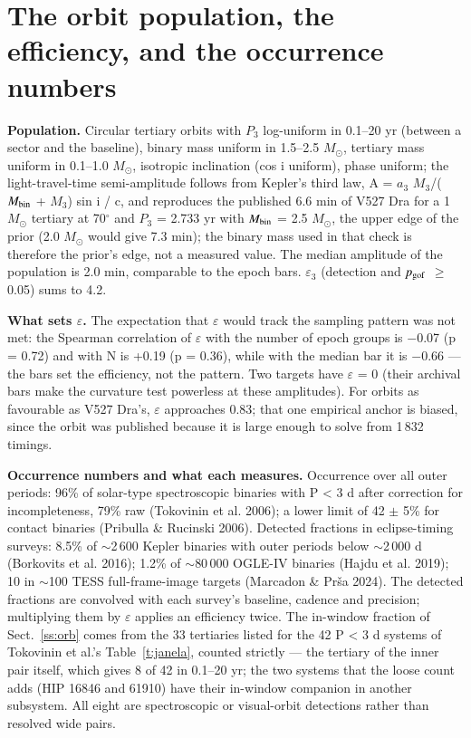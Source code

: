 \documentclass{aa}
\begin{document}
\section{The orbit population, the efficiency, and the occurrence numbers}\label{a:B}
\textbf{Population.} Circular tertiary orbits with $P_3$ log-uniform in 0.1--20 yr (between a sector and the baseline), binary mass uniform in 1.5--2.5 $M_\odot$, tertiary mass uniform in 0.1--1.0 $M_\odot$, isotropic inclination (cos i uniform), phase uniform; the light-travel-time semi-amplitude follows from Kepler's third law, A = $a_3$ $M_3$/($M_{\rm bin}$ + $M_3$) sin i / c, and reproduces the published 6.6 min of V527 Dra for a 1 $M_\odot$ tertiary at 70$^\circ$ and $P_3$ = 2.733 yr with $M_{\rm bin}$ = 2.5 $M_\odot$, the upper edge of the prior (2.0 $M_\odot$ would give 7.3 min); the binary mass used in that check is therefore the prior's edge, not a measured value. The median amplitude of the population is 2.0 min, comparable to the epoch bars. $\varepsilon_3$ (detection and $p_{\rm gof}$ $\ge$ 0.05) sums to 4.2.

\textbf{What sets $\varepsilon$.} The expectation that $\varepsilon$ would track the sampling pattern was not met: the Spearman correlation of $\varepsilon$ with the number of epoch groups is $-$0.07 (p = 0.72) and with N is +0.19 (p = 0.36), while with the median bar it is $-$0.66 --- the bars set the efficiency, not the pattern. Two targets have $\varepsilon$ = 0 (their archival bars make the curvature test powerless at these amplitudes). For orbits as favourable as V527 Dra's, $\varepsilon$ approaches 0.83; that one empirical anchor is biased, since the orbit was published because it is large enough to solve from 1\,832 timings.

\textbf{Occurrence numbers and what each measures.} Occurrence over all outer periods: 96\% of solar-type spectroscopic binaries with P < 3 d after correction for incompleteness, 79\% raw (Tokovinin et al. 2006); a lower limit of 42 $\pm$ 5\% for contact binaries (Pribulla \& Rucinski 2006). Detected fractions in eclipse-timing surveys: 8.5\% of $\sim$2\,600 Kepler binaries with outer periods below $\sim$2\,000 d (Borkovits et al. 2016); 1.2\% of $\sim$80\,000 OGLE-IV binaries (Hajdu et al. 2019); 10 in $\sim$100 TESS full-frame-image targets (Marcadon \& Prša 2024). The detected fractions are convolved with each survey's baseline, cadence and precision; multiplying them by $\varepsilon$ applies an efficiency twice. The in-window fraction of Sect.~\ref{ss:orb} comes from the 33 tertiaries listed for the 42 P < 3 d systems of Tokovinin et al.'s Table~\ref{t:janela}, counted strictly --- the tertiary of the inner pair itself, which gives 8 of 42 in 0.1--20 yr; the two systems that the loose count adds (HIP 16846 and 61910) have their in-window companion in another subsystem. All eight are spectroscopic or visual-orbit detections rather than resolved wide pairs.
\end{document}
